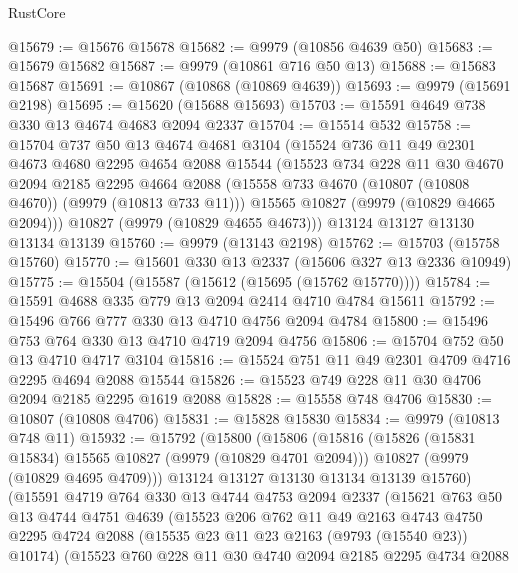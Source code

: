 \begin{lexlean}{RustCore}
\begin{coremodule}
@15679 := @15676 @15678
@15682 := @9979 (@10856 @4639 @50)
@15683 := @15679 @15682
@15687 := @9979 (@10861 @716 @50 @13)
@15688 := @15683 @15687
@15691 := @10867 (@10868 (@10869 @4639))
@15693 := @9979 (@15691 @2198)
@15695 := @15620 (@15688 @15693)
@15703 := @15591 @4649 @738 @330 @13 @4674 @4683 @2094 @2337
@15704 := @15514 @532
@15758 := @15704
    @737
    @50
    @13
    @4674
    @4681
    @3104
    (@15524
      @736
      @11
      @49
      @2301
      @4673
      @4680
      @2295
      @4654
      @2088
      @15544
      (@15523
        @734
        @228
        @11
        @30
        @4670
        @2094
        @2185
        @2295
        @4664
        @2088
        (@15558 @733 @4670 (@10807 (@10808 @4670)) (@9979 (@10813 @733 @11)))
        @15565
        @10827
        (@9979 (@10829 @4665 @2094)))
      @10827
      (@9979 (@10829 @4655 @4673)))
    @13124
    @13127
    @13130
    @13134
    @13139
@15760 := @9979 (@13143 @2198)
@15762 := @15703 (@15758 @15760)
@15770 := @15601 @330 @13 @2337 (@15606 @327 @13 @2336 @10949)
@15775 := @15504 (@15587 (@15612 (@15695 (@15762 @15770))))
@15784 := @15591 @4688 @335 @779 @13 @2094 @2414 @4710 @4784 @15611
@15792 := @15496 @766 @777 @330 @13 @4710 @4756 @2094 @4784
@15800 := @15496 @753 @764 @330 @13 @4710 @4719 @2094 @4756
@15806 := @15704 @752 @50 @13 @4710 @4717 @3104
@15816 := @15524 @751 @11 @49 @2301 @4709 @4716 @2295 @4694 @2088 @15544
@15826 := @15523 @749 @228 @11 @30 @4706 @2094 @2185 @2295 @1619 @2088
@15828 := @15558 @748 @4706
@15830 := @10807 (@10808 @4706)
@15831 := @15828 @15830
@15834 := @9979 (@10813 @748 @11)
@15932 := @15792
    (@15800
      (@15806
        (@15816
          (@15826 (@15831 @15834) @15565 @10827 (@9979 (@10829 @4701 @2094)))
          @10827
          (@9979 (@10829 @4695 @4709)))
        @13124
        @13127
        @13130
        @13134
        @13139
        @15760)
      (@15591
        @4719
        @764
        @330
        @13
        @4744
        @4753
        @2094
        @2337
        (@15621
          @763
          @50
          @13
          @4744
          @4751
          @4639
          (@15523
            @206
            @762
            @11
            @49
            @2163
            @4743
            @4750
            @2295
            @4724
            @2088
            (@15535 @23 @11 @23 @2163 (@9793 (@15540 @23)) @10174)
            (@15523
              @760
              @228
              @11
              @30
              @4740
              @2094
              @2185
              @2295
              @4734
              @2088

\end{coremodule}
\end{lexlean}
